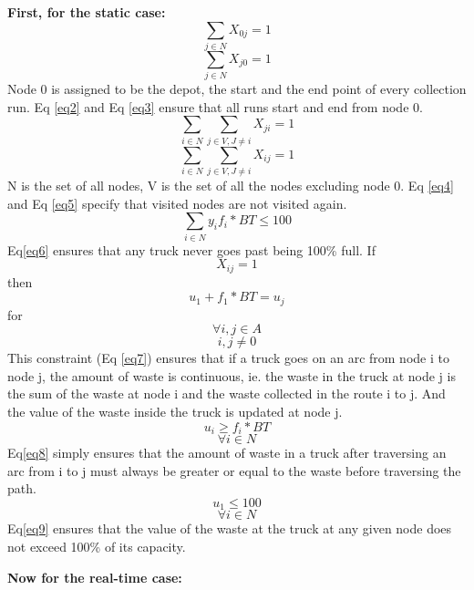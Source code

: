 \documentclass[12pt]{article}
\begin{document}
\textbf{First, for the static case:}
\begin{equation}\label{eq2}
    \sum_{j\in N} X_{0 j}=1
\end{equation}
\begin{equation}\label{eq3}
    \sum_{j\in N} X_{j0}=1
\end{equation}
Node 0 is assigned to be the depot, the start and the end point of every collection run. Eq \eqref{eq2} and Eq \eqref{eq3} ensure that all runs start and end from node 0.
\begin{equation}\label{eq4}
    \sum_{i\in N}\sum_{j\in V, J\ne i} X_{ji}=1
\end{equation}
\begin{equation}\label{eq5}
    \sum_{i\in N}\sum_{j\in V, J\ne i} X_{ij}=1
\end{equation}
N is the set of all nodes, V is the set of all the nodes excluding node 0. Eq \eqref{eq4}
and Eq \eqref{eq5} specify that visited nodes are not visited again.
\begin{equation}\label{eq6}
    \sum_{i\in N}{y_{i}f_i*BT}\le100
\end{equation}
Eq\eqref{eq6} ensures that any truck never goes past being 100\% full.
If
$$ X_{ij}=1$$
then
\begin{equation}\label{eq7}
    u_1+f_1*BT =u_j
\end{equation}
for 
$$ \forall i,j \in A$$
$$ i,j\ne 0$$
This constraint (Eq \eqref{eq7}) ensures that if a truck goes on an arc from node i to node j, the amount of waste is continuous, ie. the waste in the truck at node j is the sum of the waste at node i and the waste collected in the route i to j. And the value of the waste inside the truck is updated at node j.
\begin{equation}\label{eq8}
    u_i\ge f_i*BT
\end{equation}
$$  \forall i\in N$$
Eq\eqref{eq8} simply ensures that the amount of waste in a truck after traversing an arc from i to j must always be greater or equal to the waste before traversing the path.
\begin{equation}\label{eq9}
    u_1\le100
\end{equation}
$$\forall i\in N $$
Eq\eqref{eq9} ensures that the value of the waste at the truck at any given node does not exceed 100\% of its capacity.

\textbf{Now for the real-time case:}
\end{document}
